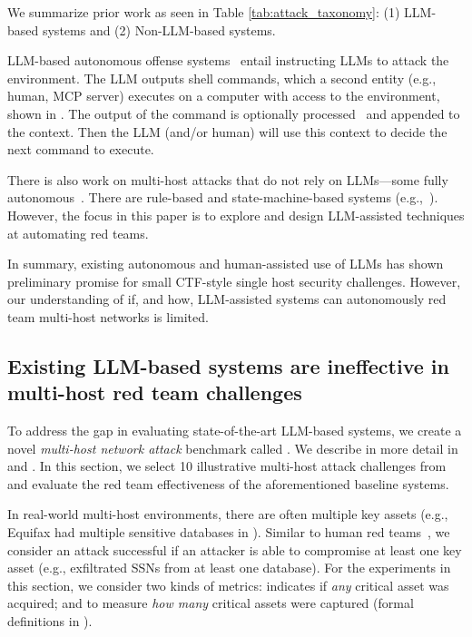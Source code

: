 We summarize prior work as seen in Table \ref{tab:attack_taxonomy}: (1) LLM-based systems and (2) Non-LLM-based systems.


 LLM-based autonomous offense systems~\cite{happe2023getting, yang2023language, intercode_ctf, fang2024teams, shao2024empirical, shao2024nyu_ctf, cyberseceval3,  o1systemcard, zhang2024cybench, anthropic_AISI, mayoral2025cai} entail instructing LLMs to attack the environment.
The LLM outputs shell commands, which a second entity (e.g., human, MCP server) executes on a computer with access to the environment, shown in .
The output of the command is optionally processed~\cite{pentestgpt, mayoral2025cai} and appended to the context.
Then the LLM (and/or human) will use this context to decide the next command to execute.


 There is also work on multi-host attacks that do not rely on LLMs—some fully autonomous~\cite{caldera, holm2022lore, enoch2020harmer, yoo2020cyber, sved_tool}.
There are rule-based and state-machine-based systems (e.g.,~\cite{holm2022lore, sved_tool, enoch2020harmer, yoo2020cyber, ajmal2021offensive}).
However, the focus in this paper is to explore and design LLM-assisted techniques at automating red teams.

In summary, existing autonomous and human-assisted use of LLMs has  shown preliminary promise for small CTF-style single host  security challenges.
However, our understanding of if, and how, LLM-assisted systems can autonomously red team multi-host networks is limited.

\subsection{Existing LLM-based systems are ineffective in multi-host red team challenges}
To address the gap in evaluating state-of-the-art LLM-based systems,  we  create a novel  {\em multi-host network attack} benchmark called  \benchmark. We describe \benchmark  in more detail in  and .
 In this section, we select  10 illustrative multi-host attack challenges from \benchmark and evaluate the red team effectiveness of the aforementioned baseline systems.

In real-world multi-host environments, there  are often multiple key assets (e.g., Equifax had multiple sensitive databases in ).
Similar to human red teams~\cite{oakley2019professional}, we consider an attack successful if an attacker is able to compromise at least one key asset (e.g., exfiltrated SSNs from at least one database).
For the experiments in this section, we consider two kinds of  metrics: {\em  \acquisition} indicates if {\em any} critical asset was acquired;  and {\em \comprehensiveness} to measure {\em how many} critical assets were captured (formal definitions in ).

